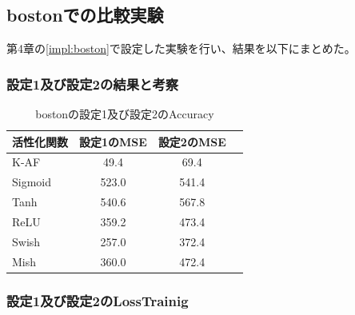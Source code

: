 \subsection{bostonでの比較実験}
\label{ev:bostonでの比較実験}

第4章の\ref{impl:boston}で設定した実験を行い、結果を以下にまとめた。
\subsubsection{設定1及び設定2の結果と考察}


\begin{table}[htbp]
    \begin{center}
        \caption{bostonの設定1及び設定2のAccuracy}
        \vspace{2mm} 
        \begin{tabular}{l*{2}{c}r}
            活性化関数              & 設定1のMSE &  設定2のMSE \\
            \hline
            K-AF            & 49.4 & 69.4 \\
            Sigmoid            & 523.0 & 541.4 \\
            Tanh            & 540.6 &  567.8 \\
            ReLU        & 359.2 & 473.4 \\
            Swish           & 257.0 & 372.4 \\
            Mish           & 360.0 & 472.4 \\
    
        \end{tabular}
    \end{center}
\end{table}


\subsubsection{設定1及び設定2のLossTrainig}
\label{boston:loss}

